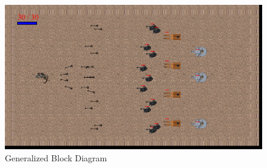 \vspace{2cm}
\begin{figure}[h]
	
	\centering
	\includegraphics[width = \textwidth]{sec/pdf/level 9}
	\caption{Generalized Block Diagram}
\end{figure}




\newpage